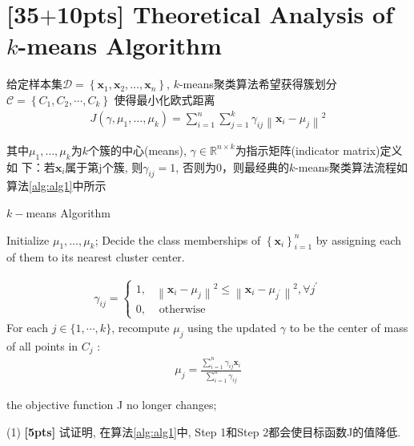 \documentclass[a4paper,UTF8]{article}
\theoremstyle{definition}
\begin{document}
\section{\textbf{[35$+$10pts]} Theoretical Analysis of $k$-means Algorithm}
给定样本集$\mathcal{D}=\left\{\mathbf{x}_{1}, \mathbf{x}_{2}, \ldots, \mathbf{x}_{n}\right\}$, $k$-means聚类算法希望获得簇划分$\mathcal{C}=\left\{C_{1}, C_{2}, \cdots, C_{k}\right\}$
使得最小化欧式距离
\begin{align} \label{eq1}
J\left(\gamma, \mu_{1}, \ldots, \mu_{k}\right)=\sum_{i=1}^{n} \sum_{j=1}^{k} \gamma_{i j}\left\|\mathbf{x}_{i}-\mu_{j}\right\|^{2}
\end{align}

其中$\mu_{1}, \ldots, \mu_{k}$为$k$个簇的中心(means), 
 $\gamma \in \mathbb{R}^{n \times k}$为指示矩阵(indicator matrix)定义如
下：若$\mathbf{x}_{i}$属于第j个簇, 则$\gamma_{i j}=1$, 否则为0，则最经典的$k$-means聚类算法流程如算法\ref{alg:alg1}中所示

{\begin{algorithm}[h]
		\caption{ $k-$means Algorithm }
		\label{alg:alg1}
		\begin{algorithmic}[1]{
				\STATE Initialize $\mu_{1}, \ldots, \mu_{k}$;
				\REPEAT
				 Decide the class memberships of $\left\{\mathbf{x}_{i}\right\}_{i=1}^{n}$ by assigning each of them
				to its nearest cluster center.
				
				\begin{align}\gamma_{i j}=\left\{\begin{array}{ll}
				1, & \left\|\mathbf{x}_{i}-\mu_{j}\right\|^{2} \leq\left\|\mathbf{x}_{i}-\mu_{j^{\prime}}\right\|^{2}, \forall j^{\prime} \\
				0, & \text { otherwise }
				\end{array}\right.\end{align}
				 For each $j \in\{1, \cdots, k\}$, recompute $\mu_j$ using the updated 
$\gamma$ to be	the center of mass of all points in $C_j$ :
			\begin{align}\mu_{j}=\frac{\sum_{i=1}^{n} \gamma_{i j} \mathbf{x}_{i}}{\sum_{i=1}^{n} \gamma_{i j}}\end{align}	
		
				\UNTIL the objective function J no longer changes;}
		\end{algorithmic}
		
\end{algorithm}}


(1) \textbf{[5pts]} 试证明, 在算法\ref{alg:alg1}中, Step 1和Step 2都会使目标函数J的值降低.
\end{document}
